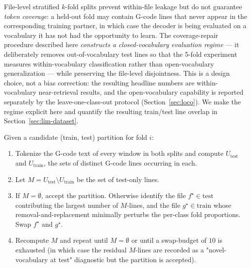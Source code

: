 \documentclass[11pt,a4paper]{article}
\begin{document}
File-level stratified $k$-fold splits prevent within-file leakage but do not guarantee \emph{token coverage}: a held-out fold may contain G-code lines that never appear in the corresponding training partner, in which case the decoder is being evaluated on a vocabulary it has not had the opportunity to learn. The coverage-repair procedure described here \emph{constructs a closed-vocabulary evaluation regime} --- it deliberately removes out-of-vocabulary test lines so that the 5-fold experiment measures within-vocabulary classification rather than open-vocabulary generalization --- while preserving the file-level disjointness. This is a design choice, not a bias correction: the resulting headline numbers are within-vocabulary near-retrieval results, and the open-vocabulary capability is reported separately by the leave-one-class-out protocol (Section~\ref{sec:loco}). We make the regime explicit here and quantify the resulting train/test line overlap in Section~\ref{sec:lim-dataset}.

Given a candidate (train, test) partition for fold $i$:
\begin{enumerate}[label=(\arabic*), leftmargin=*]
\item Tokenize the G-code text of every window in both splits and compute $U_{\text{test}}$ and $U_{\text{train}}$, the sets of distinct G-code lines occurring in each.
\item Let $M = U_{\text{test}} \setminus U_{\text{train}}$ be the set of test-only lines.
\item If $M = \emptyset$, accept the partition. Otherwise identify the file $f^\star \in \text{test}$ contributing the largest number of $M$-lines, and the file $g^\star \in \text{train}$ whose removal-and-replacement minimally perturbs the per-class fold proportions. Swap $f^\star$ and $g^\star$.
\item Recompute $M$ and repeat until $M = \emptyset$ or until a swap-budget of $10$ is exhausted (in which case the residual $M$-lines are recorded as a "novel-vocabulary at test" diagnostic but the partition is accepted).
\end{enumerate}
\end{document}

